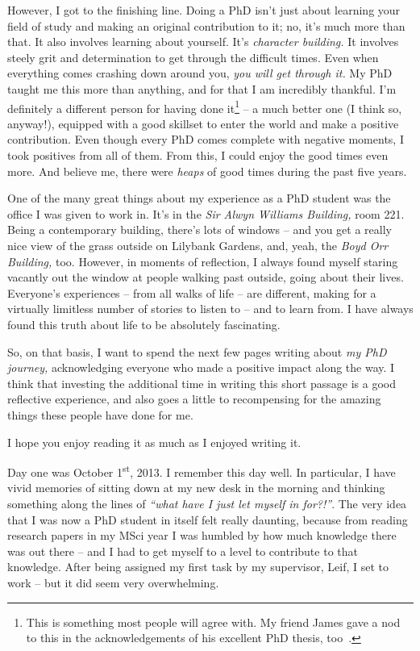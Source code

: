 \begin{preamble}
However, I got to the finishing line. Doing a PhD isn't just about learning your field of study and making an original contribution to it; no, it's much more than that. It also involves learning about yourself. It's \emph{character building.} It involves steely grit and determination to get through the difficult times. Even when everything comes crashing down around you, \emph{you will get through it.} My PhD taught me this more than anything, and for that I am incredibly thankful. I'm definitely a different person for having done it\footnote{This is something most people will agree with. My friend James gave a nod to this in the acknowledgements of his excellent PhD thesis, too~\citep{mcminn2018phd}.} -- a much better one (I think so, anyway!), equipped with a good skillset to enter the world and make a positive contribution. Even though every PhD comes complete with negative moments, I took positives from all of them. From this, I could enjoy the good times even more. And believe me, there were \emph{heaps} of good times during the past five years.

One of the many great things about my experience as a PhD student was the office I was given to work in. It's in the \emph{Sir Alwyn Williams Building,} room 221. Being a contemporary building, there's lots of windows -- and you get a really nice view of the grass outside on Lilybank Gardens, and, yeah, the \emph{Boyd Orr Building,} too. However, in moments of reflection, I always found myself staring vacantly out the window at people walking past outside, going about their lives. Everyone's experiences -- from all walks of life -- are different, making for a virtually limitless number of stories to listen to -- and to learn from. I have always found this truth about life to be absolutely fascinating.

So, on that basis, I want to spend the next few pages writing about \emph{my PhD journey,} acknowledging everyone who made a positive impact along the way. I think that investing the additional time in writing this short passage is a good reflective experience, and also goes a little to recompensing for the amazing things these people have done for me.

I hope you enjoy reading it as much as I enjoyed writing it.


Day one was October 1\textsuperscript{st}, 2013. I remember this day well. In particular, I have vivid memories of sitting down at my new desk in the morning and thinking something along the lines of \emph{``what have I just let myself in for?!''}. The very idea that I was now a PhD student in itself felt really daunting, because from reading research papers in my MSci year I was humbled by how much knowledge there was out there -- and I had to get myself to a level to contribute to that knowledge. After being assigned my first task by my supervisor, Leif, I set to work -- but it did seem very overwhelming.


\end{preamble}
